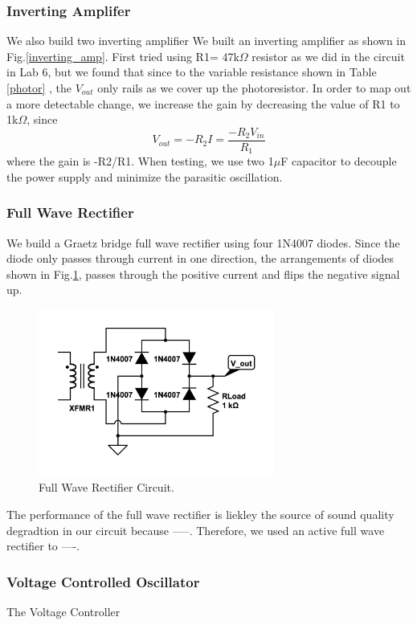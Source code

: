 \documentclass[twocolumn]{article}
\begin{document}
\subsubsection{Inverting Amplifer}
\par We also build two inverting amplifier 
We built an inverting amplifier as shown in Fig.\ref{inverting_amp}. First tried using R1= 47k$\Omega$ resistor as we did in the circuit in Lab 6, but we found that since to the variable resistance shown in Table \ref{photor} , the $V_{out}$ only rails as we cover up the photoresistor. In order to map out a more detectable change, we increase the gain by decreasing the value of R1 to 1k$\Omega$, since
\begin{equation}
V_{out} = -R_2I = \frac{-R_2V_{in}}{R_1}
\end{equation}
where the gain is -R2/R1. When testing, we use two 1$\mu$F capacitor to decouple the power supply and minimize the parasitic oscillation. 

\subsubsection{Full Wave Rectifier}
We build a Graetz bridge full wave rectifier using four 1N4007 diodes. Since the diode only passes through current in one direction, the arrangements of diodes shown in Fig.\ref{rectifier}, passes through the positive current and flips the negative signal up.
\begin{figure}[h!]
 \centering
 \includegraphics[width=220pt]{figure/full_wave_rectifier.jpg}
\caption{Full Wave Rectifier Circuit.}
\label{rectifier}
\end{figure}
\par The performance of the full wave rectifier is liekley the source of sound quality degradtion in our circuit because -----. Therefore, we used an active full wave rectifier to ----.
\subsubsection{Voltage Controlled Oscillator}
The Voltage Controller 
\end{document}
